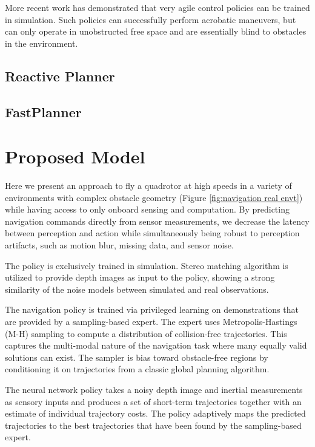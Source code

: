 More recent work has demonstrated that very agile control
policies can be trained in simulation. Such policies can successfully perform acrobatic maneuvers, but can only
operate in unobstructed free space and are essentially blind to obstacles
in the environment.

\subsection{Reactive Planner}
\subsection{FastPlanner}

\section{Proposed Model}
Here we present an approach to fly a quadrotor at high speeds in
a variety of environments with complex obstacle geometry (Figure \ref{fig:navigation real envt}) while having access to only onboard sensing and computation. By predicting navigation commands directly from sensor
measurements, we decrease the latency between perception and action while simultaneously being robust to perception artifacts, such
as motion blur, missing data, and sensor noise. 

The policy
is exclusively trained in simulation. Stereo matching algorithm is utilized to provide depth images as input
to the policy, showing a strong similarity of the noise models between simulated
and real observations.

The navigation policy is trained via privileged learning on
demonstrations that are provided by a sampling-based expert. The expert
uses Metropolis-Hastings (M-H) sampling to compute a distribution
of collision-free trajectories. This captures the multi-modal nature of
the navigation task where many equally valid solutions can exist. The sampler is bias toward
obstacle-free regions by conditioning it on trajectories from a classic
global planning algorithm.

The neural network policy takes a
noisy depth image and inertial measurements as sensory inputs and
produces a set of short-term trajectories together with an estimate of
individual trajectory costs. The policy
adaptively maps the
predicted trajectories to the best trajectories that have been found by the sampling-based expert. 

